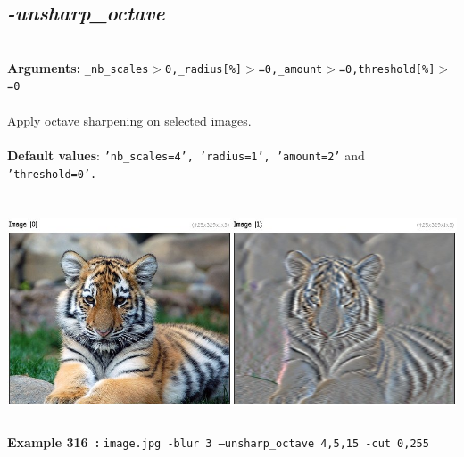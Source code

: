\documentclass[a4paper,11pt,twoside]{book}
\begin{document}
\subsection{\emph{-unsharp\_octave} }\vspace*{-0.5em}
~\\\textbf{Arguments: } 
{\small \texttt{\_nb\_scales$>$0,\_radius[\%]$>$=0,\_amount$>$=0,threshold[\%]$>$=0}}\\~\\
Apply octave sharpening on selected images.
~\\~\\\textbf{Default values}: {\small \texttt{'nb\_scales=4', 'radius=1', 'amount=2'} and \texttt{'threshold=0'.}}
\begin{center}\includegraphics[keepaspectratio=true,height=7cm,width=\textwidth]{img/gmic_def316.jpg}\\
{\footnotesize \textbf{Example 316~:} \texttt{image.jpg -blur 3 --unsharp\_octave 4,5,15 -cut 0,255}}
\end{center}
\end{document}
